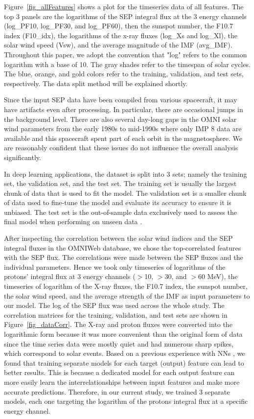 Figure~\ref{fig_allFeatures} shows a plot for the timeseries data of all features.
The top 3 panels are the logarithms of the SEP integral flux at the 3 energy channels (log\_PF10, log\_PF30, and log\_PF60), then the sunspot number, the F10.7 index (F10\_idx), the logarithms of the x-ray fluxes (log\_Xs and log\_Xl), the solar wind speed (Vsw), and the average magnitude of the IMF (avg\_IMF).
Throughout this paper, we adopt the convention that "log" refers to the common logarithm with a base of 10.
The gray shades refer to the timespan of solar cycles.
The blue, orange, and gold colors refer to the training, validation, and test sets, respectively. The data split method will be explained shortly.

Since the input SEP data have been compiled from various spacecraft, it may have artifacts even after processing. In particular, there are occasional jumps in the background level. There are also several day-long gaps in the OMNI solar wind parameters from the early 1980s to mid-1990s where only IMP 8 data are available and this spacecraft spent part of each orbit in the magnetosphere. We are reasonably confident that these issues do not influence the overall analysis significantly.

In deep learning applications, the dataset is split into 3 sets; namely the training set, the validation set, and the test set. The training set is usually the largest chunk of data that is used to fit the model. The validation set is a smaller chunk of data used to fine-tune the model and evaluate its accuracy to ensure it is unbiased. The test set is the out-of-sample data exclusively used to assess the final model when performing on unseen data \citep{ripley_2007}.

After inspecting the correlation between the solar wind indices and the SEP integral fluxes in the OMNIWeb database, we chose the top-correlated features with the SEP flux. The correlations were made between the SEP fluxes and the individual parameters. Hence we took only timeseries of logarithms of the protons' integral flux at 3 energy channels ($>$10, $>$30, and $>$60 MeV), the timeseries of logarithm of the X-ray fluxes, the F10.7 index, the sunspot number, the solar wind speed, and the average strength of the IMF as input parameters to our model.
The log of the SEP flux was used across the whole study.
The correlation matrices for the training, validation, and test sets are shown in Figure~\ref{fig_dataCorr}.
The X-ray and proton fluxes were converted into the logarithmic form because it was more convenient than the original form of data since the time series data were mostly quiet and had numerous sharp spikes, which correspond to solar events.
Based on a previous experience with NNs \citep{mnedal_2019}, we found that training separate models for each target (output) feature can lead to better results. This is because a dedicated model for each  output feature can more easily learn the interrelationships between input features and make more accurate predictions. Therefore, in our current study, we trained 3 separate models, each one targeting the logarithm of the protons integral flux at a specific energy channel.

